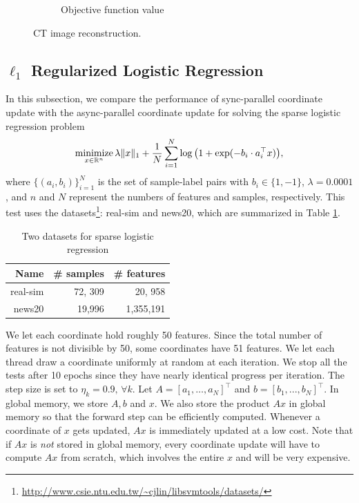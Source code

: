 \begin{figure}[!htb]
\begin{subfigure}{0.45\linewidth}
         \caption{Objective function value}\label{fig:pds_d}		                
        \label{fig:a}
    \end{subfigure} %
    \caption{CT image reconstruction.}
    \label{fig:pds_results}
\end{figure}


\subsection{$\ell_1$ Regularized Logistic Regression}
In this subsection, we compare the performance of sync-parallel coordinate update with the async-parallel coordinate update for solving the sparse logistic regression problem 
\begin{equation}\label{eqn:log}
\Min_{x \in \mathbb{R}^n} \lambda \|x\|_1 + \frac{1}{N} \sum_{i=1}^N \log\big(1 + \exp(-b_i \cdot a_i^{\top} x)\big),
\end{equation}
where $\{(a_i, b_i)\}_{i=1}^N$ is the set of sample-label pairs with $b_i \in \{1, -1\}$, $\lambda=0.0001$, and $n$ and $N$ represent the numbers of features and samples, respectively. This test uses the datasets\footnote{\url{http://www.csie.ntu.edu.tw/~cjlin/libsvmtools/datasets/}}: real-sim and news20, which are summarized in Table \ref{tab:log_data}.

\begin{table}[htbp]
\centering
 \caption{\label{tab:log_data}Two  datasets for  sparse logistic regression }
 \begin{tabular}{rrr}
\hline
  Name & \# samples & \# features \\
  \hline
 real-sim & 72, 309 & 20, 958 \\
  news20 & 19,996 & 1,355,191\\
  \hline
 \end{tabular}
\end{table}

We let each coordinate hold roughly 50 features. {Since the total number of features is not divisible by 50, some coordinates have 51 features.} We let each thread draw a coordinate uniformly at random at each iteration. We stop all the tests after 10 epochs since they have nearly identical progress per iteration. %
The step size is set to $\eta_k=0.9,\,\forall k$. Let $A = [a_1, \ldots, a_N]^{\top}$ and $b = [b_1, ..., b_N]^{\top}$. In global memory, we store $A, b$ and $x$. We also store the product $Ax$ in global memory so that the forward step can be efficiently computed. Whenever a coordinate of $x$ gets updated, $Ax$ is immediately updated at a low cost. Note that if $Ax$ is \emph{not} stored in global memory, every coordinate update will have to compute $Ax$ from scratch, which involves the entire $x$ and will be very expensive.  %

